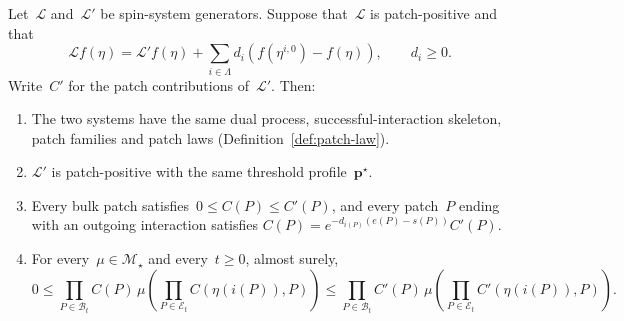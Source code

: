 \documentclass[EJP,preprint,NODS,nobera]{ejpecp}
\newcommand{\bb}[1]{\left(#1\right)}
\newcommand{\mb}[1]{\mathbf{#1}}
\newcommand{\Lcal}{\mathcal{L}}
\begin{document}
\begin{proposition}
\label{prop:death-removal}
Let~$\Lcal$ and~$\Lcal'$ be spin-system generators. Suppose that~$\Lcal$ is
patch-positive and that
\begin{equation}
\label{eq:pure-death-decomposition-revision}
\Lcal f(\eta)
=
\Lcal'f(\eta)
+
\sum_{i\in\Lambda}d_i
\bb{f\bb{\eta^{i,0}}-f(\eta)},
\qquad d_i\geq0.
\end{equation}
Write~$C'$ for the patch contributions of~$\Lcal'$. Then:
\begin{enumerate}[label=\textup{(\roman*)}]
\item The two systems have the same dual process, successful-interaction
skeleton, patch families and patch laws
(Definition~\ref{def:patch-law}).
\item $\Lcal'$ is patch-positive with the same threshold profile~$\mb p^\star$.
\item Every bulk patch satisfies~$0\leq C(P)\leq C'(P)$, and every patch~$P$
ending with an outgoing interaction satisfies
$C(P)=e^{-d_{i(P)}(e(P)-s(P))}C'(P)$.
\item For every~$\mu\in\mathcal M_\star$ and every~$t\geq0$, almost surely,
\begin{equation}
\label{eq:death-removal-weight-comparison}
0
\leq
\prod_{P\in\mathcal B_t}C(P)\,
\mu\bb{
\prod_{P\in\mathcal E_t}
C\bb{\eta\bb{i(P)},P}
}
\leq
\prod_{P\in\mathcal B_t}C'(P)\,
\mu\bb{
\prod_{P\in\mathcal E_t}
C'\bb{\eta\bb{i(P)},P}
}.
\end{equation}
\end{enumerate}
\end{proposition}
\end{document}
